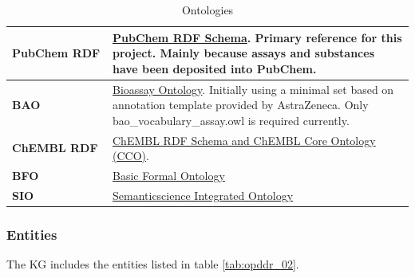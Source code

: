 \begin{table}
\caption{Ontologies}
\label{tab:opddr_01}
\centering
\begin{tabular}{p{0.25\linewidth}p{0.75\linewidth}}
\hline
\textbf{PubChem RDF} & \href{http://rdf.ncbi.nlm.nih.gov/pubchem/}{PubChem RDF Schema}. Primary reference for this project.  Mainly because assays and substances have been deposited into PubChem.\\
\hline
\textbf{BAO} & \href{http://www.bioassayontology.org/bao\#}{Bioassay Ontology}.  Initially using a minimal set based on annotation template provided by AstraZeneca.  Only bao\_vocabulary\_assay.owl is required currently.\\
\hline
\textbf{ChEMBL RDF} & \href{http://rdf.ebi.ac.uk/terms/chembl\#}{ChEMBL RDF Schema and ChEMBL Core Ontology (CCO)}. 
\\
\hline
\textbf{BFO} &  \href{http://purl.obolibrary.org/obo/}{Basic Formal Ontology}\\
\hline
\textbf{SIO} & \href{http://semanticscience.org/resource/}{Semanticscience Integrated Ontology}\\
\hline
\end{tabular}
\end{table}

\subsubsection{Entities}

The KG includes the entities listed in table \ref{tab:opddr_02}.

